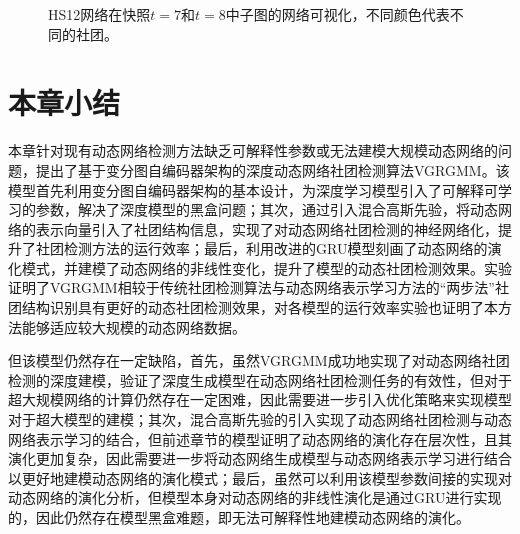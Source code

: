 \begin{figure}[htbp]
{    }
    \caption{HS12网络在快照$t=7$和$t=8$中子图的网络可视化，不同颜色代表不同的社团。}
    \label{fig:case}
\end{figure}






\section{本章小结\label{chap6:summary}}
本章针对现有动态网络检测方法缺乏可解释性参数或无法建模大规模动态网络的问题，提出了基于变分图自编码器架构的深度动态网络社团检测算法VGRGMM。该模型首先利用变分图自编码器架构的基本设计，为深度学习模型引入了可解释可学习的参数，解决了深度模型的黑盒问题；其次，通过引入混合高斯先验，将动态网络的表示向量引入了社团结构信息，实现了对动态网络社团检测的神经网络化，提升了社团检测方法的运行效率；最后，利用改进的GRU模型刻画了动态网络的演化模式，并建模了动态网络的非线性变化，提升了模型的动态社团检测效果。实验证明了VGRGMM相较于传统社团检测算法与动态网络表示学习方法的“两步法”社团结构识别具有更好的动态社团检测效果，对各模型的运行效率实验也证明了本方法能够适应较大规模的动态网络数据。

但该模型仍然存在一定缺陷，首先，虽然VGRGMM成功地实现了对动态网络社团检测的深度建模，验证了深度生成模型在动态网络社团检测任务的有效性，但对于超大规模网络的计算仍然存在一定困难，因此需要进一步引入优化策略来实现模型对于超大模型的建模；其次，混合高斯先验的引入实现了动态网络社团检测与动态网络表示学习的结合，但前述章节的模型证明了动态网络的演化存在层次性，且其演化更加复杂，因此需要进一步将动态网络生成模型与动态网络表示学习进行结合以更好地建模动态网络的演化模式；最后，虽然可以利用该模型参数间接的实现对动态网络的演化分析，但模型本身对动态网络的非线性演化是通过GRU进行实现的，因此仍然存在模型黑盒难题，即无法可解释性地建模动态网络的演化。






